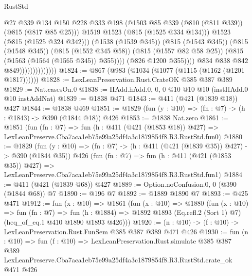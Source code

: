 \begin{lexlean}{RustStd}
\begin{coremodule}
                                              @27
                                              @339
                                              @134
                                              @150
                                              @228
                                              @333
                                              @198
                                              (@1503
                                                @85
                                                @339
                                                (@810 (@811 @339))
                                                (@815 (@817 @85 @25)))
                                              @1519
                                              @1523
                                              (@815 (@1525 @334 @134)))
                                            @1523
                                            (@815 (@1525 @324 @342)))
                                          (@1538 (@1539 @345))
                                          (@815 (@1543 @345))
                                          (@815 (@1548 @345))
                                          (@815 (@1552 @345 @58))
                                          (@815 (@1557 @82 @58 @25))
                                          (@815 (@1563 (@1564 (@1565 @345)) @355))))
                                      (@826 @1200 @355))))
                                @834
                                @838
                                @842
                                @849))))))))))))))
@1824 := @867 (@983 (@1034 (@1077 (@1115 (@1162 (@1201 @1817))))))
@1828 := LexLeanPreservation.Rust.CrateOK @385 @387 @389
@1829 := Nat.casesOn.{0}
@1838 := HAdd.hAdd.{0, 0, 0} @10 @10 @10 (instHAdd.{0} @10 instAddNat)
@1839 := @1838 @471
@1843 := @411 (@421 (@1839 @18)) @427
@1844 := @1838 @469
@1851 := @1829 (fun (y : @10) => (fn : @7) -> (h : @1843) -> @390 (@1844 @18)) @426
@1853 := @1838 Nat.zero
@1861 := @1851
    (fun (fn : @7) =>
    fun (h : @411 (@421 (@1853 @18)) @427) =>
    LexLeanPreserve.Cba7aca1eb75e99a25df4a3c1879854f8.R3.RustStd.fun0)
@1880 := @1829
    (fun (y : @10) => (fn : @7) -> (h : @411 (@421 (@1839 @35)) @427) -> @390 (@1844 @35))
    @426
    (fun (fn : @7) =>
    fun (h : @411 (@421 (@1853 @35)) @427) =>
    LexLeanPreserve.Cba7aca1eb75e99a25df4a3c1879854f8.R3.RustStd.fun1)
@1884 := @411 (@421 (@1839 @68)) @427
@1889 := Option.noConfusion.{0, 0} (@390 (@1844 @68)) @7
@1890 := @196 @7
@1892 := @1889 @1890 @7
@1893 := @425 @471
@1912 := fun (x : @10) =>
  @1861
    (fun (x : @10) =>
    @1880
      (fun (x : @10) =>
      fun (fn : @7) =>
      fun (h : @1884) =>
      @1892 @1893 (Eq.refl.{2} (Sort 1) @7) (heq_of_eq.{1} @410 @1890 @1893 @426)))
@1920 := (n : @10) -> (f : @10) -> LexLeanPreservation.Rust.FunSem @385 @387 @389 @471 @426
@1930 := fun (n : @10) =>
  fun (f : @10) =>
  LexLeanPreservation.Rust.simulate
    @385
    @387
    @389
    LexLeanPreserve.Cba7aca1eb75e99a25df4a3c1879854f8.R3.RustStd.crate_ok
    @471
    @426
\end{coremodule}
\end{lexlean}
